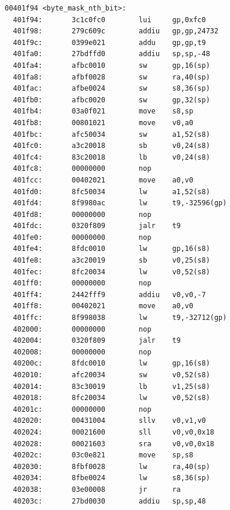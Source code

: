 \documentclass[11pt]{article}
\begin{document}
\begin{verbatim}
00401f94 <byte_mask_nth_bit>:
  401f94:       3c1c0fc0        lui     gp,0xfc0
  401f98:       279c609c        addiu   gp,gp,24732
  401f9c:       0399e021        addu    gp,gp,t9
  401fa0:       27bdffd0        addiu   sp,sp,-48
  401fa4:       afbc0010        sw      gp,16(sp)
  401fa8:       afbf0028        sw      ra,40(sp)
  401fac:       afbe0024        sw      s8,36(sp)
  401fb0:       afbc0020        sw      gp,32(sp)
  401fb4:       03a0f021        move    s8,sp
  401fb8:       00801021        move    v0,a0
  401fbc:       afc50034        sw      a1,52(s8)
  401fc0:       a3c20018        sb      v0,24(s8)
  401fc4:       83c20018        lb      v0,24(s8)
  401fc8:       00000000        nop
  401fcc:       00402021        move    a0,v0
  401fd0:       8fc50034        lw      a1,52(s8)
  401fd4:       8f9980ac        lw      t9,-32596(gp)
  401fd8:       00000000        nop
  401fdc:       0320f809        jalr    t9
  401fe0:       00000000        nop
  401fe4:       8fdc0010        lw      gp,16(s8)
  401fe8:       a3c20019        sb      v0,25(s8)
  401fec:       8fc20034        lw      v0,52(s8)
  401ff0:       00000000        nop
  401ff4:       2442fff9        addiu   v0,v0,-7
  401ff8:       00402021        move    a0,v0
  401ffc:       8f998038        lw      t9,-32712(gp)
  402000:       00000000        nop
  402004:       0320f809        jalr    t9
  402008:       00000000        nop
  40200c:       8fdc0010        lw      gp,16(s8)
  402010:       afc20034        sw      v0,52(s8)
  402014:       83c30019        lb      v1,25(s8)
  402018:       8fc20034        lw      v0,52(s8)
  40201c:       00000000        nop
  402020:       00431004        sllv    v0,v1,v0
  402024:       00021600        sll     v0,v0,0x18
  402028:       00021603        sra     v0,v0,0x18
  40202c:       03c0e821        move    sp,s8
  402030:       8fbf0028        lw      ra,40(sp)
  402034:       8fbe0024        lw      s8,36(sp)
  402038:       03e00008        jr      ra
  40203c:       27bd0030        addiu   sp,sp,48


\end{verbatim}
\end{document}
